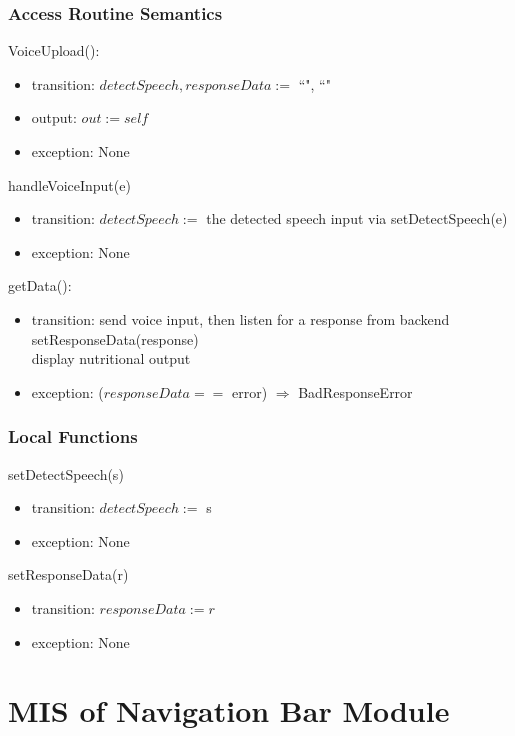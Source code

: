 \documentclass[12pt, titlepage]{article}
\begin{document}
\subsubsection{Access Routine Semantics}
\noindent VoiceUpload():
\begin{itemize}
	\item transition: $detectSpeech, responseData :=$ ``", ``"
	\item output: $out := self$ 
	\item exception: None
\end{itemize}
\noindent handleVoiceInput(e)
\begin{itemize}
	\item transition: $detectSpeech :=$ the detected speech input via 
	setDetectSpeech(e)
	\item exception: None
\end{itemize}
\noindent getData():
\begin{itemize}
	\item transition: send voice input, then listen for a response from 
	backend\\ setResponseData(response)\\ display nutritional output
	\item exception: ($responseData ==$ error) $\Rightarrow$ BadResponseError
\end{itemize}
\subsubsection{Local Functions}
\noindent setDetectSpeech(s)
\begin{itemize}
	\item transition: $ detectSpeech := $ s
	\item exception: None
\end{itemize}
\noindent setResponseData(r)
\begin{itemize}
	\item transition: $ responseData:=r $
	\item exception: None
\end{itemize}

\newpage

\section{MIS of Navigation Bar Module} \label{Navbar}
\end{document}
